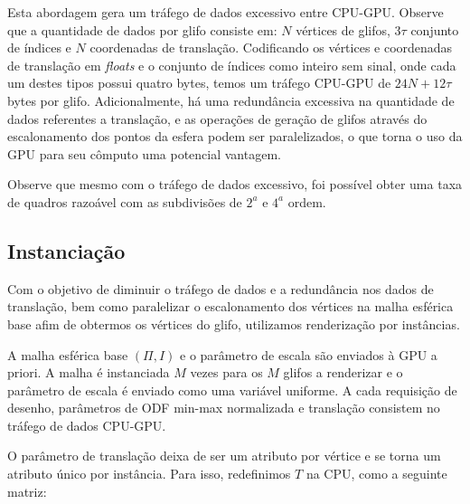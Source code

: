 \documentclass[
    12pt,                %
    oneside,            %
    a4paper,            %
    english,            %
    french,                %
    spanish,            %
    brazil                %
    ]{abntex2}
\begin{document}
Esta abordagem gera um tráfego de dados excessivo entre CPU-GPU. Observe que a quantidade de dados por glifo consiste em: $N$ vértices de glifos, $3\tau$ conjunto de índices e $N$ coordenadas de translação. Codificando os vértices e coordenadas de translação em \textit{floats} e o conjunto de índices como inteiro sem sinal, onde cada um destes tipos possui quatro bytes, temos um tráfego CPU-GPU de $24N + 12\tau$ bytes por glifo. Adicionalmente, há uma redundância excessiva na quantidade de dados referentes a translação, e as operações de geração de glifos através do escalonamento dos pontos da esfera podem ser paralelizados, o que torna o uso da GPU para seu cômputo uma potencial vantagem.

Observe que mesmo com o tráfego de dados excessivo, foi possível obter uma taxa de quadros razoável com as subdivisões de $2^a$ e $4^a$ ordem.



\subsection{Instanciação}
\label{sec::renderizacao_por_instancias}

Com o objetivo de diminuir o tráfego de dados e a redundância nos dados de translação, bem como paralelizar o escalonamento dos vértices na malha esférica base afim de obtermos os vértices do glifo, utilizamos renderização por instâncias.

A malha esférica base $(\Pi, I)$ e o parâmetro de escala são enviados à GPU a priori. A malha é instanciada $M$ vezes para os $M$ glifos a renderizar e o parâmetro de escala é enviado como uma variável uniforme. A cada requisição de desenho, parâmetros de ODF min-max normalizada e translação consistem no tráfego de dados CPU-GPU.

O parâmetro de translação deixa de ser um atributo por vértice e se torna um atributo único por instância. Para isso, redefinimos $T$ na CPU, como a seguinte matriz:
\end{document}
